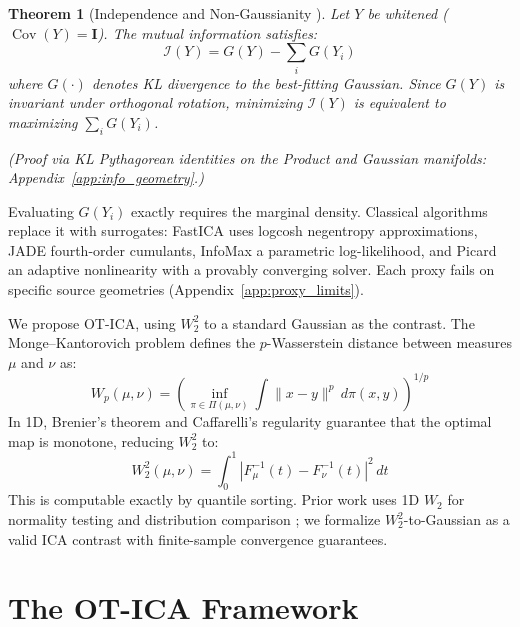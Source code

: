\documentclass{tpm2026} %
\newtheorem{theorem}{Theorem}
\begin{document}
\begin{theorem}[Independence and Non-Gaussianity \citep{cardoso2022}]
Let $Y$ be whitened ($\operatorname{Cov}(Y)=\mathbf{I}$). The mutual information satisfies:
\begin{equation}
    \mathscr{I}(Y) = G(Y) - \sum_{i} G(Y_i)
\end{equation}
where $G(\cdot)$ denotes KL divergence to the best-fitting Gaussian. Since $G(Y)$ is invariant under orthogonal rotation, minimizing $\mathscr{I}(Y)$ is equivalent to maximizing $\sum_i G(Y_i)$.
\end{theorem}
\textit{(Proof via KL Pythagorean identities on the Product and Gaussian manifolds: Appendix~\ref{app:info_geometry}.)}

Evaluating $G(Y_i)$ exactly requires the marginal density. Classical algorithms replace it with surrogates: FastICA \citep{hyvarinen2001, amari1996new} uses logcosh negentropy approximations, JADE \citep{cardoso1993blind} fourth-order cumulants, InfoMax \citep{bell1995information} a parametric log-likelihood, and Picard \citep{ablin2018faster} an adaptive nonlinearity with a provably converging solver. Each proxy fails on specific source geometries (Appendix~\ref{app:proxy_limits}).

We propose OT-ICA, using $W_2^2$ to a standard Gaussian as the contrast. The Monge--Kantorovich problem \citep{monge1781, kantorovich1942} defines the $p$-Wasserstein distance between measures $\mu$ and $\nu$ as:
\begin{equation}
    W_p(\mu, \nu) = \left( \inf_{\pi \in \Pi(\mu, \nu)} \int \|x - y\|^p \, d\pi(x, y) \right)^{1/p}
\end{equation}
In 1D, Brenier's theorem \citep{brenier1991} and Caffarelli's regularity \citep{caffarelli1992} guarantee that the optimal map is monotone, reducing $W_2^2$ to:
\begin{equation}
    W_2^2(\mu, \nu) = \int_0^1 |F_\mu^{-1}(t) - F_\nu^{-1}(t)|^2 \, dt
\end{equation}
This is computable exactly by quantile sorting. Prior work uses 1D $W_2$ for normality testing \citep{delbarrio1999} and distribution comparison \citep{peyre2019computational}; we formalize $W_2^2$-to-Gaussian as a valid ICA contrast with finite-sample convergence guarantees.

\section{The OT-ICA Framework}
\end{document}
